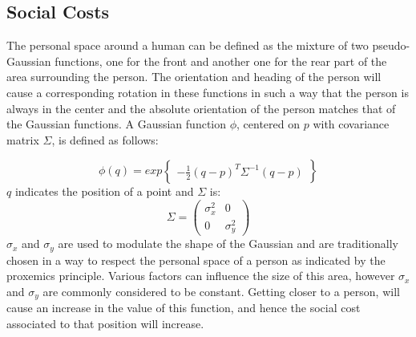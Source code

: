 
\subsection{Social Costs}


The personal space around a human can be defined as the mixture of two pseudo-Gaussian functions, one for the front and another one for the rear part of the area surrounding the person. The orientation and heading of the person will cause a corresponding rotation in these functions in such a way that the person is always in the center and the absolute orientation of the person matches that of the Gaussian functions. 
A Gaussian function $\phi$, centered on $p$ with covariance matrix $\Sigma$, is defined as follows:

\begin{equation}\label{eq:phi}
\phi(q) = exp\begin{Bmatrix}
-\frac{1}{2}(q-p)^{T}\Sigma^{-1}(q-p)
\end{Bmatrix}\end{equation}
$q$ indicates the position of a point and $\Sigma$ is:
\begin{equation}
\Sigma = \begin{pmatrix}
{\sigma}_{x}^2  & 0\\ 
 0& {\sigma}_{y}^2 
\end{pmatrix}
\end{equation}
${\sigma}_{x}$ and ${\sigma}_{y}$ are used to modulate the shape of the Gaussian and are traditionally chosen in a way to respect the personal space of a person as indicated by the proxemics principle. Various factors can influence the size of this area, however ${\sigma}_{x}$ and ${\sigma}_{y}$ are commonly considered to be constant. Getting closer to a person, will cause an increase in the value of this function, and hence the social cost associated to that position will increase.


